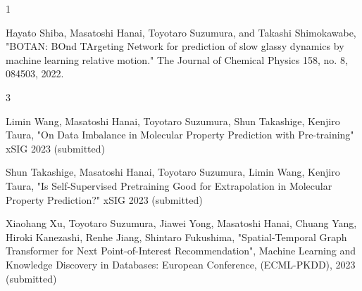 \begin{雑誌論文}{1}

Hayato Shiba, Masatoshi Hanai, Toyotaro Suzumura, and Takashi Shimokawabe, "BOTAN: BOnd TArgeting Network for prediction of slow glassy dynamics by machine learning relative motion." The Journal of Chemical Physics 158, no. 8, 084503, 2022.
\end{雑誌論文}

\begin{査読付}{3}

Limin Wang, Masatoshi Hanai, Toyotaro Suzumura, Shun Takashige, Kenjiro Taura, "On Data Imbalance in Molecular Property Prediction with Pre-training" xSIG 2023 (submitted)

Shun Takashige, Masatoshi Hanai, Toyotaro Suzumura, Limin Wang, Kenjiro Taura, "Is Self-Supervised Pretraining Good for Extrapolation in Molecular Property Prediction?" xSIG 2023 (submitted)

Xiaohang Xu, Toyotaro Suzumura, Jiawei Yong, Masatoshi Hanai, Chuang Yang, Hiroki Kanezashi, Renhe Jiang, Shintaro Fukushima, "Spatial-Temporal Graph Transformer for Next Point-of-Interest Recommendation", Machine Learning and Knowledge Discovery in Databases: European Conference, (ECML-PKDD), 2023 (submitted)

\end{査読付}
